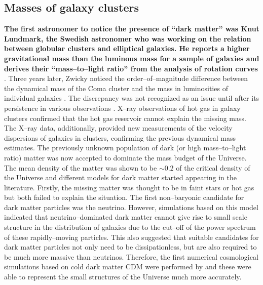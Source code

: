 \documentclass[a4wide,12pt]{book}
\newcommand{\ignore}[1]{}
\begin{document}
\subsection{Masses of galaxy clusters}
{\bf The first astronomer to notice the presence of ``dark matter'' was Knut Lundmark, the Swedish astronomer who was working on the relation between globular clusters and elliptical galaxies. He reports a higher gravitational mass than the luminous mass for a sample of galaxies and derives their ``mass--to--light ratio'' from the analysis of rotation curves \citep[][]{Lundmark1930}}. Three years later, Zwicky noticed the order--of--magnitude difference between the dynamical mass of the Coma cluster and the mass in luminosities of individual galaxies \citep[][]{Zwicky1933}. The discrepancy was not recognized as an issue until after its persistence in various observations \citep[][]{Rubin.Ford1970, Einasto+1974, Ostriker+1974}. X--ray observations of hot gas in galaxy clusters confirmed that the hot gas reservoir cannot explain the missing mass. The X--ray data, additionally, provided new measurements of the velocity dispersions of galaxies in clusters, confirming the previous dynamical mass estimates\ignore{(Forman et al. 1972, Gursky et al. 1972, Kellogg et al. 1973)}. The previously unknown population of dark (or high mass--to--light ratio) matter was now accepted to dominate the mass budget of the Universe. The mean density of the matter was shown to be $\sim 0.2$ of the critical density of the Universe and different models for dark matter started appearing in the literature. Firstly, the missing matter was thought to be in faint stars or hot gas but both failed to explain the situation\ignore{cite and explain why! or maybe not as it's not really important now!!}. The first non--baryonic candidate for dark matter particles was the neutrino. However, simulations based on this model \citep[][]{Doroshkevich+1978} indicated that neutrino--dominated dark matter cannot give rise to small scale structure in the distribution of galaxies due to the cut--off of the power spectrum of these rapidly--moving particles. This also suggested that suitable candidates for dark matter particles not only need to be dissipationless, but are also required to be much more massive than neutrinos\ignore{(Blumenthal et al. 1982, Bond et al. 1982, Peebles, 1982)}. Therefore, the first numerical cosmological simulations based on cold dark matter CDM were performed by \citet[][]{Melott+1983} and these were able to represent the small structures of the Universe much more accurately.
\end{document}

